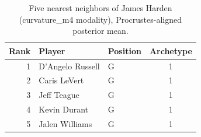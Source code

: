 \begin{table}[htbp]
  \centering\small
  \begin{tabular}{rllc}
    \toprule
    Rank & Player & Position & Archetype \\
    \midrule
    1 & D'Angelo Russell & G & 1 \\
    2 & Caris LeVert & G & 1 \\
    3 & Jeff Teague & G & 1 \\
    4 & Kevin Durant & G & 1 \\
    5 & Jalen Williams & G & 1 \\
    \bottomrule
  \end{tabular}
  \caption{Five nearest neighbors of James Harden (curvature_m4 modality), Procrustes-aligned posterior mean.}
  \label{tab:James_Harden_neighbors_curvature_m4}
\end{table}


